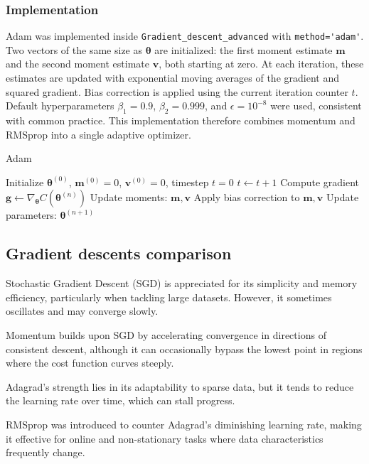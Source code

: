 \documentclass[
    article
 reprint,            %
 amsmath,amssymb,
 aps,
]{revtex4-2}
\begin{document}
\subsubsection{Implementation}

Adam was implemented inside \verb|Gradient_descent_advanced| with \verb|method='adam'|. Two vectors of the same size as $\boldsymbol{\theta}$ are initialized: the first moment estimate $\mathbf{m}$ and the second moment estimate $\mathbf{v}$, both starting at zero. At each iteration, these estimates are updated with exponential moving averages of the gradient and squared gradient. Bias correction is applied using the current iteration counter $t$.
Default hyperparameters $\beta_1=0.9$, $\beta_2=0.999$, and $\epsilon=10^{-8}$ were used, consistent with common practice. This implementation therefore combines momentum and RMSprop into a single adaptive optimizer.
\begin{algorithm}[H]
\caption{Adam}
\begin{algorithmic}[1]
\State Initialize $\boldsymbol{\theta}^{(0)}$, $\mathbf{m}^{(0)}=0$, $\mathbf{v}^{(0)}=0$, timestep $t=0$
\State $t \gets t+1$
\State Compute gradient $\mathbf{g} \gets \nabla_{\boldsymbol{\theta}} C(\boldsymbol{\theta}^{(n)})$
\State Update moments: $\mathbf{m}, \mathbf{v}$
\State Apply bias correction to $\mathbf{m}, \mathbf{v}$
\State Update parameters: $\boldsymbol{\theta}^{(n+1)}$
\EndFor
\end{algorithmic}
\end{algorithm}

\subsection{Gradient descents comparison}
Stochastic Gradient Descent (SGD) is appreciated for its simplicity and memory efficiency, particularly when tackling large datasets. However, it sometimes oscillates and may converge slowly. 

Momentum builds upon SGD by accelerating convergence in directions of consistent descent, although it can occasionally bypass the lowest point in regions where the cost function curves steeply. 

Adagrad's strength lies in its adaptability to sparse data, but it tends to reduce the learning rate over time, which can stall progress. 

RMSprop was introduced to counter Adagrad's diminishing learning rate, making it effective for online and non-stationary tasks where data characteristics frequently change. 
\end{document}
